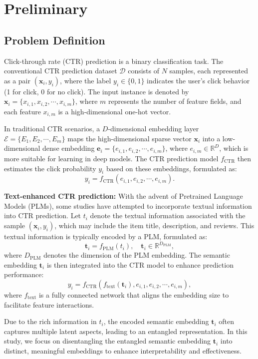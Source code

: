 \chapter{Preliminary}

\section{Problem Definition}

Click-through rate (CTR) prediction is a binary classification task. The conventional CTR prediction dataset $\mathcal{D}$ consists of $N$ samples, each represented as a pair $(\mathbf{x}_i, y_i)$, where the label $y_i \in \{0, 1\}$ indicates the user's click behavior (1 for click, 0 for no click). The input instance is denoted by $\mathbf{x}_i = \{x_{i,1}, x_{i,2}, \cdots, x_{i,m}\}$, where $m$ represents the number of feature fields, and each feature $x_{i,m}$ is a high-dimensional one-hot vector.

In traditional CTR scenarios, a $D$-dimensional embedding layer $\mathcal{E} = \{E_1, E_2, \cdots, E_m\}$ maps the high-dimensional sparse vector $\mathbf{x}_i$ into a low-dimensional dense embedding $\mathbf{e}_i = \{e_{i,1}, e_{i,2}, \cdots, e_{i,m}\}$, where $e_{i,m} \in \mathbb{R}^{D}$, which is more suitable for learning in deep models. The CTR prediction model $f_{\text{CTR}}$ then estimates the click probability $y_i$ based on these embeddings, formulated as:
\[
y_i = f_{\text{CTR}}(e_{i,1}, e_{i,2}, \cdots, e_{i,m}).
\]

\textbf{Text-enhanced CTR prediction:} With the advent of Pretrained Language Models (PLMs), some studies have attempted to incorporate textual information into CTR prediction. Let $t_i$ denote the textual information associated with the sample $(\mathbf{x}_i, y_i)$, which may include the item title, description, and reviews. This textual information is typically encoded by a PLM, formulated as:
\[
\mathbf{t}_i = f_{\text{PLM}}(t_i), \quad \mathbf{t}_i \in \mathbb{R}^{D_{\text{PLM}}},
\]
where $D_{\text{PLM}}$ denotes the dimension of the PLM embedding. The semantic embedding $\mathbf{t}_i$ is then integrated into the CTR model to enhance prediction performance:
\[
y_i = f_{\text{CTR}}(f_{\text{text}}(\mathbf{t}_i), e_{i,1}, e_{i,2}, \cdots, e_{i,m}),
\]
where $f_{\text{text}}$ is a fully connected network that aligns the embedding size to facilitate feature interactions.

Due to the rich information in $t_i$, the encoded semantic embedding $\mathbf{t}_i$ often captures multiple latent aspects, leading to an entangled representation. In this study, we focus on disentangling the entangled semantic embedding $\mathbf{t}_i$ into distinct, meaningful embeddings to enhance interpretability and effectiveness.


